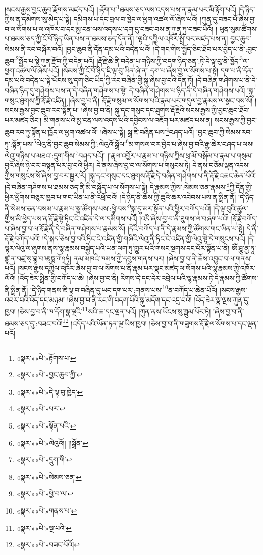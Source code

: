 །སངས་རྒྱས་བྱང་ཆུབ་རྫོགས་མཛད་པའོ། །:རྟོག་པ་\footnote{«སྣར་»«པེ་»རྟོགས་པ་}ཐམས་ཅད་ལས་འདས་པས་ན་རྣམ་པར་མི་རྟོག་པའོ། །དེ་ཉིད་ཀྱིས་ན་དམིགས་སུ་མེད་པ་སྟེ། དམིགས་པ་དང་བྲལ་བ་ཁྱེད་ལ་ཕྱག་འཚལ་ལོ་ཞེས་པའོ། །ཀུན་དུ་བཟང་པོ་ཞེས་བྱ་བ་ལ་སོགས་པ་ལ་འཁོར་བ་དང་མྱ་ངན་ལས་འདས་པ་དག་དུ་བཟང་བས་ན་ཀུན་ཏུ་བཟང་པོའོ། །
ཕུན་སུམ་ཚོགས་པ་ཐམས་ཅད་ཀྱི་ངོ་བོ་ཉིད་ཡིན་པས་ན་ཐམས་ཅད་དོན་ནོ། །ལྷའི་དཀྱིལ་འཁོར་སྤྲོ་བར་མཛད་པས་ན། བྱང་ཆུབ་སེམས་ནི་རབ་བསྐོར་བའོ། །བྱང་ཆུབ་ནི་དོན་དམ་པའི་བདེན་པའོ། །དེ་གང་གིས་སྤྱོད་ཅིང་ཐོབ་པར་བྱེད་པ་ནི་:བྱང་ཆུབ་\footnote{«སྣར་»«པེ་»བྱང་ཆུབ་ཀྱི་}སྤྱོད་པ་སྟེ་ཀུན་རྫོབ་ཀྱི་བདེན་པའོ། །རྡོ་རྗེ་ཆེ་ནི་བདེན་པ་གཉིས་ཀྱི་བདག་ཉིད་ཅན་:ཏེ་དེ་ལྟ་བུ་ནི་ཁྱོད་\footnote{«སྣར་»«པེ་»དེ་ལྟ་བུ་ཁྱེད་}ལ་ཕྱག་འཚལ་ལོ་ཞེས་པའོ། །སེམས་ཀྱི་ངོ་བོ་ཉིད་ཇི་ལྟ་བུ་ཡིན་ཞེ་ན། དག་པ་ཞེས་བྱ་ལ་སོགས་པ་སྟེ། དག་པ་ནི་དོན་དམ་པའི་བདེན་པ་སྟེ་ཡོངས་སུ་དག་ཅིང་ཡིད་ཀྱི་རང་བཞིན་གྱི་སྐུ་ཞེས་བྱ་བའི་དོན་ཏོ། །དེ་བཞིན་གཤེགས་པ་ནི་དེ་བཞིན་ཉིད་དུ་གཤེགས་པས་ན་དེ་བཞིན་གཤེགས་པ་སྟེ། དེ་བཞིན་གཤེགས་པ་ཉིད་ནི་དེ་བཞིན་གཤེགས་པའོ། །སྐུ་གསུང་ཐུགས་ཀྱི་རྡོ་རྗེ་འཛིན། །ཞེས་བྱ་བ་ནི། རྡོ་རྗེ་གསུམ་ལ་སོགས་པའི་རྣམ་པར་གདུལ་བྱ་རྣམས་ལ་སྣང་བས་སོ། །སངས་རྒྱས་བྱང་ཆུབ་རབ་སྟོན་པ། །ཞེས་བྱ་བ་ནི། སྐུ་དང་གསུང་དང་ཐུགས་རྡོ་རྗེའི་སངས་རྒྱས་ཀྱི་བྱང་ཆུབ་ཐོབ་པར་མཛད་ཅིང་། མི་གནས་པའི་མྱ་ངན་ལས་འདས་པའི་དབྱིངས་ལ་འཇོག་པར་མཛད་པས་ན། སངས་རྒྱས་ཀྱི་བྱང་ཆུབ་རབ་ཏུ་སྟོན་པ་ཁྱོད་ལ་ཕྱག་འཚལ་ལོ། །ཞེས་པ་སྟེ། སྒྲ་ཇི་བཞིན་པས་\footnote{«སྣར་»«པེ་»པར་}བཤད་པའོ། །བྱང་ཆུབ་ཀྱི་སེམས་རབ་ཏུ་:སྟོན་པས་\footnote{«སྣར་»«པེ་»སྟོན་པའི་}ལེའུ་ནི་བྱང་ཆུབ་སེམས་ཀྱི་:ལེའུའོ་སྒྲོལ་\footnote{«སྣར་»«པེ་»ལེའུའོ།། །།སྒྲོན་}མ་གསལ་བར་བྱེད་པ་ཞེས་བྱ་བའི་རྒྱ་ཆེར་བཤད་པ་ལས། ལེའུ་གཉིས་པ་མཐའ་:དྲུག་གིས་\footnote{«སྣར་»«པེ་»དྲུག་གི་}བཤད་པའོ།། །།རྣལ་འབྱོར་པ་རྣམ་པ་གཉིས་ཀྱིས་ཕྲ་མོ་བསྒོམ་པ་རྣམ་པ་གསུམ་བྱའོ་ཞེས་ཉེ་བར་བསྟན་པར་བྱ་བའི་ཕྱིར། དེ་ནས་ཞེས་བྱ་བ་ལ་སོགས་པ་གསུངས་ཏེ། དེ་ནས་བཅོམ་ལྡན་འདས་ཀྱིས་གསུངས་སོ་ཞེས་བྱ་བར་སྦྱར་རོ། །སྐུ་དང་གསུང་དང་ཐུགས་རྡོ་རྗེ་དེ་བཞིན་གཤེགས་པ་ནི་རྡོ་རྗེ་འཆང་ཆེན་པོའོ། །དེ་བཞིན་གཤེགས་པ་ཐམས་ཅད་ནི་མི་བསྐྱོད་པ་ལ་སོགས་པ་སྟེ། དེ་རྣམས་ཀྱིས་:སེམས་ཅན་རྣམས་\footnote{«སྣར་»«པེ་»སེམས་ཅན་}ཀྱི་དོན་གྱི་ཕྱིར་ཕྱོགས་བཅུར་ཁྱབ་པ་གང་ཡིན་པ་ནི་འཕྲོ་བའོ། །དེ་ཉིད་ནི་ཆོས་ཀྱི་ཆུའི་ཆར་འབེབས་པས་ན་སྤྲིན་ནོ། །དེ་ཉིད་ནི་སེམས་ཅན་བསམ་པ་རྣམ་པ་སྣ་ཚོགས་པས་:ཕྱེ་བས་\footnote{«སྣར་»«པེ་»ཕྱེ་བ་ལ་}སྐུ་དུ་མར་སྟོན་པའི་ཕྱིར་བཀོད་པའོ། །དེ་ལྟ་བུའི་ཚུལ་གྱིས་མི་ཕྱེད་པས་ན་རྡོ་རྗེ་སྟེ་ཏིང་ངེ་འཛིན་དེ་ལ་དམིགས་པའོ། །འདི་ཞེས་བྱ་བ་ནི་ཐུགས་ལ་བཞག་པའོ། །རྡོ་རྗེ་བཀོད་པ་ཞེས་བྱ་བ་ལ་རྡོ་རྗེ་ནི་དེ་བཞིན་གཤེགས་པ་རྣམས་སོ། །དེའི་བཀོད་པ་ནི་དེ་རྣམས་ཀྱི་ཚོགས་གང་ཡིན་པ་སྟེ། དེ་ནི་རྡོ་རྗེ་བཀོད་པའོ། །དེ་སྐད་ཅེས་བྱ་བའི་ཏིང་ངེ་འཛིན་གྱི་གཞིའི་ལེའུ་ནི་ཏིང་ངེ་འཛིན་གྱི་ལེའུ་སྟེ་དེ་གསུངས་པའོ། །དེ་ལྟར་ལེའུ་ལ་ཞུགས་ནས་ལྷ་རྣམས་བསྐྱེད་པའི་ཡན་ལག་ཏུ་གྱུར་པའི་གསང་སྔགས་དང་པོར་སྟོན་པ་ནི། ཨོཾ་ཤཱུ་ནྱ་ཏཱ་ཛྙཱ་ན་བཛྲ་སྭ་བྷཱ་བ་ཨཱཏྨ་ཀོ྅ཧཾ། ནམ་མཁའི་ཁམས་ཀྱི་དབུས་གནས་པར། །ཞེས་བྱ་བ་ནི་ཆོས་འབྱུང་བ་ལ་གནས་པའོ། །སངས་རྒྱས་དཀྱིལ་འཁོར་ཞེས་བྱ་བ་ལ་སོགས་པ་ནི་རྣམ་པར་སྣང་མཛད་ལ་སོགས་པའི་ལྷ་རྣམས་ཀྱི་འཁོར་ལོའོ། །འོད་ཟེར་སྤྲིན་གྱི་བཀོད་པ་ཆེ། །ཞེས་བྱ་བ་ནི། རིགས་དེ་དང་དེར་འབྲེལ་པའི་ལྷ་རྣམས་ཏེ་དེ་རྣམས་ཀྱི་ཚོགས་ནི་སྤྲིན་ནོ། །དེ་ཉིད་གནས་ཇི་ལྟ་བ་བཞིན་དུ་ཡང་དག་པར་:གནས་པས་\footnote{«སྣར་»«པེ་»གནས་པ་}ན་བཀོད་པ་ཆེན་པོའོ། །སངས་རྒྱས་འབར་བའི་འོད་དང་མཉམ། །ཞེས་བྱ་བ་ནི་རང་གི་བདག་པོའི་སྐུ་མདོག་དང་འདྲ་བའོ། །འོད་ཟེར་སྣ་ལྔས་ཀུན་དུ་ཁྱབ། །ཅེས་བྱ་བ་ནི་ཁ་དོག་སྣ་ལྔའི་\footnote{«སྣར་»«པེ་»ལྔ་པའི་}སའི་ཆ་དང་ལྡན་པའོ། །ཀུན་ནས་ཡོངས་སུ་ཟླུམ་པོར་ཏེ། །ཞེས་བྱ་བ་ནི་ཐམས་ཅད་དུ་:བཟང་བའོ།\footnote{«སྣར་»«པེ་»བཟང་པོའོ།} །འདོད་པའི་ཡོན་ཏན་ལྔ་ཡིས་ཁྱབ། །ཅེས་བྱ་བ་ནི་གཟུགས་རྡོ་རྗེ་ལ་སོགས་པ་དང་ལྡན་པའོ། 